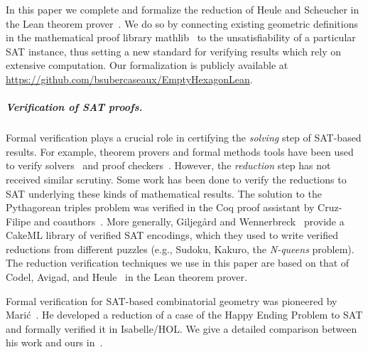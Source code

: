 
In this paper we complete and formalize the reduction of Heule and Scheucher in the Lean theorem prover~\cite{demouraLeanTheoremProver2015}. We do so by connecting existing geometric definitions
in the mathematical proof library \textsf{mathlib}~\cite{The_mathlib_Community_2020}
to the unsatisfiability of a particular SAT instance, thus setting a new standard for verifying results which rely on extensive computation.
Our formalization is publicly available at \url{https://github.com/bsubercaseaux/EmptyHexagonLean}.


\subparagraph*{Verification of SAT proofs.}
Formal verification plays a crucial role in certifying the \emph{solving} step of SAT-based results.
For example, theorem provers and formal methods tools have been used to verify solvers~\cite{10maric_formal_verification_modern_sat_solver_shallow_embedding_isabelle_hol,oeVersatVerifiedModern2012,skotam_creusat_2022}
and proof checkers~\cite{lammichEfficientVerifiedSAT2020,tanVerifiedPropagationRedundancy2023}.
However, the \emph{reduction} step has not received similar scrutiny.
Some work has been done to verify the reductions to SAT underlying these kinds of mathematical results.
The solution to the Pythagorean triples problem
was verified in the \textsf{Coq} proof assistant
by Cruz-Filipe and coauthors~\cite{formalPythagoreanTriples,LPAR-21:Formally_Proving_Boolean_Pythagorean}.
More generally,
Giljeg\r{a}rd and Wennerbreck~\cite{GilAndWennerbeck} provide a \textsf{CakeML} library
of verified SAT encodings,
which they used to write verified reductions from different puzzles
(e.g., Sudoku, Kakuro, the \emph{N-queens} problem).
The reduction verification techniques we use in this paper
are based on that of Codel, Avigad, and Heule~\cite{Cayden} in the Lean theorem prover.

Formal verification for SAT-based combinatorial geometry
was pioneered by Marić~\cite{19maric_fast_formal_proof_erdos_szekeres_conjecture_convex_polygons_most_six_points}.
He developed a reduction of a case of the Happy Ending Problem to SAT
and formally verified it in \textsf{Isabelle/HOL}.
We give a detailed comparison between his work and ours in~.

